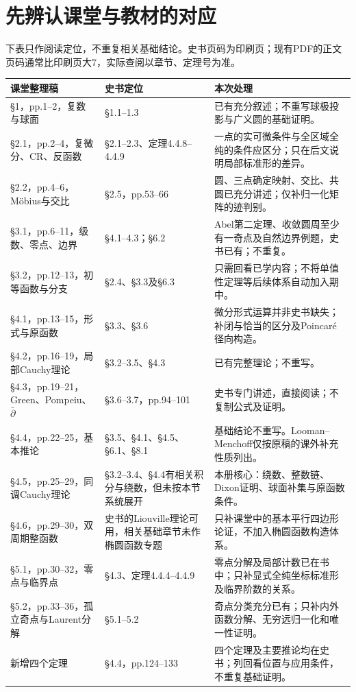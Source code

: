 \documentclass[11pt,a4paper,fontset=fandol]{ctexart}
\theoremstyle{definition}\newtheorem{theorem}{定理}[section]\newtheorem{proposition}[theorem]{命题}\newtheorem{definition}[theorem]{定义}
\begin{document}
\section{先辨认课堂与教材的对应}
下表只作阅读定位，不重复相关基础结论。史书页码为印刷页；现有PDF的正文页码通常比印刷页大7，实际查阅以章节、定理号为准。
\small
\begin{longtable}{p{}p{}p{}}
\toprule 课堂整理稿 & 史书定位 & 本次处理\\\midrule\endhead
§1，pp.1--2，复数与球面 & §1.1--1.3 & 已有充分叙述；不重写球极投影与广义圆的基础证明。\\
§2.1，pp.2--4，复微分、CR、反函数 & §2.1--2.3、定理4.4.8--4.4.9 & 一点的实可微条件与全区域全纯的条件应区分；只在后文说明局部标准形的差异。\\
§2.2，pp.4--6，Möbius与交比 & §2.5，pp.53--66 & 圆、三点确定映射、交比、共圆已充分讲述；仅补归一化矩阵的迹判别。\\
§3.1，pp.6--11，级数、零点、边界 & §4.1--4.3；§6.2 & Abel第二定理、收敛圆周至少有一奇点及自然边界例题，史书已有；不重复。\\
§3.2，pp.12--13，初等函数与分支 & §2.4、§3.3及§6.3 & 只需回看已学内容；不将单值性定理等后续体系自动加入期中。\\
§4.1，pp.13--15，形式与原函数 & §3.3、§3.6 & 微分形式运算并非史书缺失；补闭与恰当的区分及Poincaré径向构造。\\
§4.2，pp.16--19，局部Cauchy理论 & §3.2--3.5、§4.3 & 已有完整理论；不重写。\\
§4.3，pp.19--21，Green、Pompeiu、$\bar\partial$ & §3.6--3.7，pp.94--101 & 史书专门讲述，直接阅读；不复制公式及证明。\\
§4.4，pp.22--25，基本推论 & §3.5、§4.1、§4.5、§6.1、§8.1 & 基础结论不重写。Looman--Menchoff仅按原稿的课外补充性质列出。\\
§4.5，pp.25--29，同调Cauchy理论 & §3.2--3.4、§4.4有相关积分与绕数，但未按本节系统展开 & 本册核心：绕数、整数链、Dixon证明、球面补集与原函数条件。\\
§4.6，pp.29--30，双周期整函数 & 史书的Liouville理论可用，相关基础章节未作椭圆函数专题 & 只补课堂中的基本平行四边形论证，不加入椭圆函数构造体系。\\
§5.1，pp.30--32，零点与临界点 & §4.3、定理4.4.4--4.4.9 & 零点分解及局部计数已在书中；只补显式全纯坐标标准形及临界阶数的关系。\\
§5.2，pp.33--36，孤立奇点与Laurent分解 & §5.1--5.2 & 奇点分类充分已有；只补内外函数分解、无穷远归一化和唯一性证明。\\
新增四个定理 & §4.4，pp.124--133 & 四个定理及主要推论均在史书；列回看位置与应用条件，不重复基础证明。\\
\bottomrule
\end{longtable}\normalsize
\end{document}
